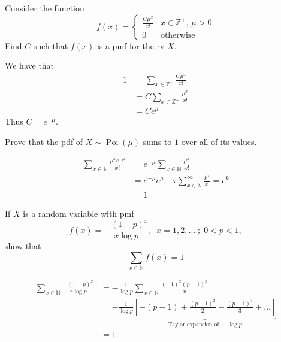 \documentclass[notoc,notitlepage]{tufte-book}
\DeclareMathOperator{\Poi}{Poi }
\begin{document}
\begin{eg}
  Consider the function
  \begin{equation*}
    f(x) = \begin{cases}
      \frac{C \mu^x}{x!} & x \in \mathbb{Z}^+, \, \mu > 0 \\
      0 & \text{otherwise}
    \end{cases}
  \end{equation*}
  Find $C$ such that $f(x)$ is a pmf for the rv $X$.

  \begin{solution}
    We have that
    \begin{align*}
      1 &= \sum_{x \in \mathbb{Z}^+} \frac{C \mu^x}{x!} \\
        &= C \sum_{x \in \mathbb{Z}^+} \frac{\mu^x}{x!} \\
        &= C e^\mu
    \end{align*}
    Thus $C = e^{- \mu}$.
  \end{solution}
\end{eg}

\begin{ex}
  Prove that the pdf of $X \sim \Poi(\mu)$ sums to $1$ over all of its values.

  \begin{solution}
    \begin{align*}
      \sum_{x \in \mathbb{N}} \frac{\mu^x e^{- \mu}}{x!}
        &= e^{- \mu} \sum_{x \in \mathbb{N}} \frac{\mu^x}{x!} \\
        &= e^{- \mu} e^\mu \quad \because \sum_{x \in \mathbb{N}}^{\infty} \frac{k^x}{x!} = e^k \\
        &= 1
    \end{align*}
  \end{solution}
\end{ex}

\begin{ex}
  If $X$ is a random variable with pmf
  \begin{equation*}
    f(x) = \frac{- (1 - p)^x}{x \log p}, \enspace x = 1, 2, ... \; ; \; 0 < p < 1,
  \end{equation*}
  show that
  \begin{equation*}
    \sum_{x \in \mathbb{N}} f(x) = 1
  \end{equation*}

  \begin{solution}
    \begin{align*}
      \sum_{x \in \mathbb{N}} \frac{- (1 - p)^x}{x \log p}
        &= - \frac{1}{\log p} \sum_{x \in \mathbb{N}} \frac{(-1)^x (p - 1)^x}{x} \\
        &= - \frac{1}{\log p} \underbrace{ \left[ - (p - 1) + \frac{(p - 1)^2}{2} - \frac{(p - 1)^3}{3} + \hdots \right] }_{\text{Taylor expansion of } - \log p} \\
        &= 1
    \end{align*}
  \end{solution}
\end{ex}
\end{document}
